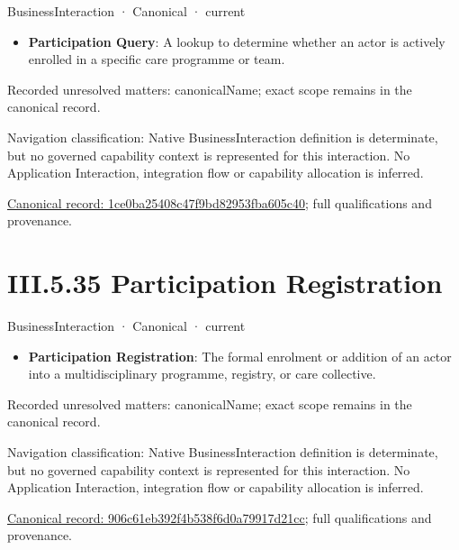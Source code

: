\label{element:1ce0ba25408c47f9bd82953fba605c40}
{\small BusinessInteraction · Canonical · current}\par

\begin{itemize}


\item \textbf{Participation Query}: A lookup to determine whether an actor is actively enrolled in a specific care programme or team.

\end{itemize}

{\small Recorded unresolved matters: canonicalName; exact scope remains in the canonical record.}\par
{\small Navigation classification: Native BusinessInteraction definition is determinate, but no governed capability context is represented for this interaction. No Application Interaction, integration flow or capability allocation is inferred.}\par
{\footnotesize \href{../../../../../../../continuum/business/business-interaction/1ce0ba25408c47f9bd82953fba605c40.md}{Canonical record: 1ce0ba25408c47f9bd82953fba605c40}; full qualifications and provenance.}\par
\section*{III.5.35 Participation Registration}
\label{navigation:III.5.35}

\label{element:906c61eb392f4b538f6d0a79917d21cc}
{\small BusinessInteraction · Canonical · current}\par

\begin{itemize}


\item \textbf{Participation Registration}: The formal enrolment or addition of an actor into a multidisciplinary programme, registry, or care collective.

\end{itemize}

{\small Recorded unresolved matters: canonicalName; exact scope remains in the canonical record.}\par
{\small Navigation classification: Native BusinessInteraction definition is determinate, but no governed capability context is represented for this interaction. No Application Interaction, integration flow or capability allocation is inferred.}\par
{\footnotesize \href{../../../../../../../continuum/business/business-interaction/906c61eb392f4b538f6d0a79917d21cc.md}{Canonical record: 906c61eb392f4b538f6d0a79917d21cc}; full qualifications and provenance.}\par

